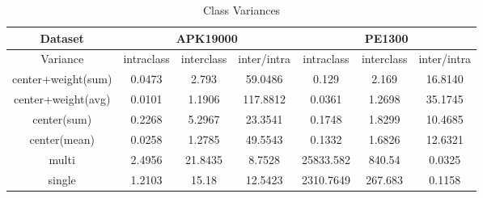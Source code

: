 \begin{table*}[!htb]%
\caption{Class Variances}
\label{tab:class_variances}
\begin{minipage}{\textwidth}
\begin{center}
\begin{tabular}{|c|c|c|c|c|c|c|}
\hline
Dataset             & \multicolumn{3}{c|}{APK19000}                               & \multicolumn{3}{c|}{PE1300}                                             \\ \hline
Variance              & intraclass  & interclass  & inter/intra & intraclass  & interclass  & inter/intra  \\ \hline
center+weight(sum)  & 0.0473              &         2.793       &     59.0486             & 0.129               &              2.169 &              16.8140    \\ \hline
center+weight(avg) & 0.0101              &              1.1906 &    117.8812             & 0.0361              &                    1.2698 &      35.1745                   \\ \hline
center(sum)         & 0.2268              &                    5.2967 &          23.3541               & 0.1748              &              1.8299       &    10.4685                     \\ \hline
center(mean)        & 0.0258              &                    1.2785 &           49.5543              & 0.1332              &        1.6826             &     12.6321                    \\ \hline
multi               & 2.4956              &                    21.8435 &       8.7528                    & 25833.582           &        840.54             &        0.0325               \\ \hline
single              & 1.2103              &                    15.18 &            12.5423             & 2310.7649           &      267.683               &           0.1158              \\ \hline
\end{tabular}
\end{center}
\bigskip\centering
\end{minipage}
\end{table*}%


